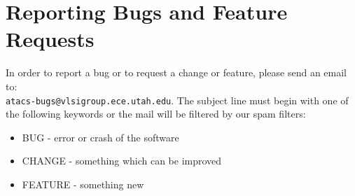 \documentclass[titlepage,11pt]{article}
\begin{document}
\section{Reporting Bugs and Feature Requests}

\noindent
In order to report a bug or to request a change or feature, please
send an email to:\\ 
{\tt atacs-bugs@vlsigroup.ece.utah.edu}.
The subject line must begin with one of the following keywords or the
mail will be filtered by our spam filters:
\begin{itemize}
\item BUG - error or crash of the software
\item CHANGE - something which can be improved
\item FEATURE - something new
\end{itemize}
 
\end{document}
